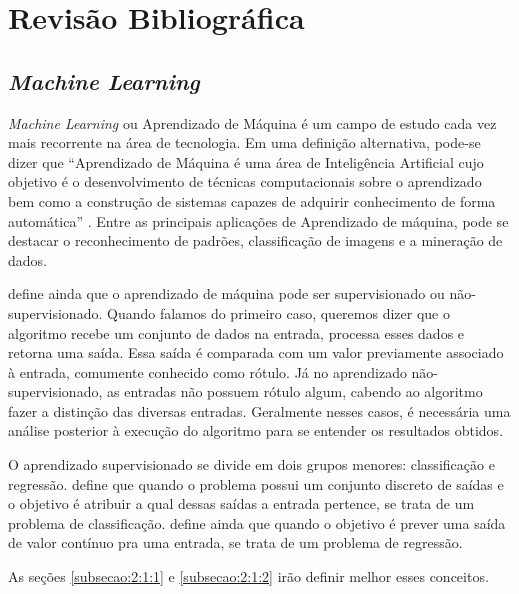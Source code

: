 \chapter{Revisão Bibliográfica}
\label{cap:2}
\vspace{-1.9cm}


\section{\textit{Machine Learning}}
\label{secao:2:1}
\vspace{-.6cm}

\textit{Machine Learning} ou Aprendizado de Máquina é um campo de estudo cada vez mais recorrente na área de tecnologia. Em uma definição alternativa, pode-se dizer que ``Aprendizado de Máquina é uma área de Inteligência Artificial cujo objetivo é o desenvolvimento de técnicas computacionais sobre o aprendizado bem como a construção de sistemas capazes de adquirir conhecimento de forma automática'' \cite{monard-2003}. Entre as principais aplicações de Aprendizado de máquina, pode se destacar o reconhecimento de padrões, classificação de imagens e a mineração de dados. 

 define ainda que o aprendizado de máquina pode ser supervisionado ou não-supervisionado. Quando falamos do primeiro caso, queremos dizer que o algoritmo recebe um conjunto de dados na entrada, processa esses dados e retorna uma saída. Essa saída é comparada com um valor previamente associado à entrada, comumente conhecido como rótulo. Já no aprendizado não-supervisionado, as entradas não possuem rótulo algum, cabendo ao algoritmo fazer a distinção das diversas entradas. Geralmente nesses casos, é necessária uma análise posterior à execução do algoritmo para se entender os resultados obtidos.

O aprendizado supervisionado se divide em dois grupos menores: classificação e regressão.  define que quando o problema possui um conjunto discreto de saídas e o objetivo é atribuir a qual dessas saídas a entrada pertence, se trata de um problema de classificação.  define ainda que quando o objetivo é prever uma saída de valor contínuo pra uma entrada, se trata de um problema de regressão.

As seções \ref{subsecao:2:1:1} e \ref{subsecao:2:1:2} irão definir melhor esses conceitos.

